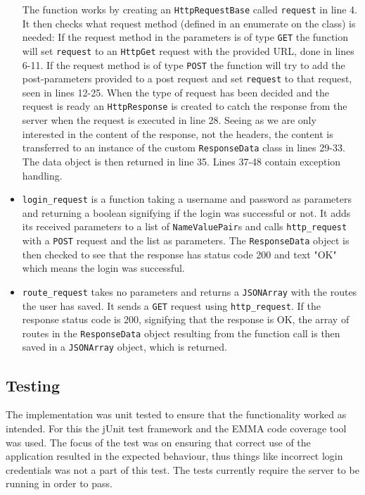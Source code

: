 \begin{itemize}
The function works by creating an \texttt{HttpRequestBase} called \texttt{request} in line 4. It then checks what request method (defined in an enumerate on the class) is needed: If the request method in the parameters is of type \texttt{GET} the function will set \texttt{request} to an \texttt{HttpGet} request with the provided URL, done in lines 6-11. If the request method is of type \texttt{POST} the function will try to add the post-parameters provided to a post request and set \texttt{request} to that request, seen in lines 12-25. When the type of request has been decided and the request is ready an \texttt{HttpResponse} is created to catch the response from the server when the request is executed in line 28. Seeing as we are only interested in the content of the response, not the headers, the content is transferred to an instance of the custom \texttt{ResponseData} class in lines 29-33. The data object is then returned in line 35. Lines 37-48 contain exception handling.
 
\item \texttt{login\_request} is a function taking a username and password as parameters and returning a boolean signifying if the login was successful or not. It adds its received parameters to a list of \texttt{NameValuePair}s and calls \texttt{http\_request} with a \texttt{POST} request and the list as parameters. The \texttt{ResponseData} object is then checked to see that the response has status code 200 and text "OK" which means the login was successful.

\item \texttt{route\_request} takes no parameters and returns a \texttt{JSONArray} with the routes the user has saved. It sends a \texttt{GET} request using \texttt{http\_request}. If the response status code is 200, signifying that the response is OK, the array of routes in the \texttt{ResponseData} object resulting from the function call is then saved in a \texttt{JSONArray} object, which is returned. 
\end{itemize}

\subsection{Testing}
The implementation was unit tested to ensure that the functionality worked as intended. For this the jUnit \cite{junit} test framework and the EMMA \cite{emma} code coverage tool was used. The focus of the test was on ensuring that correct use of the application resulted in the expected behaviour, thus things like incorrect login credentials was not a part of this test. The tests currently require the server to be running in order to pass.

